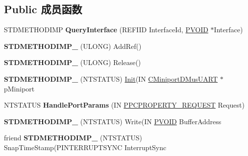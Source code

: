 \subsection*{Public 成员函数}
\begin{DoxyCompactItemize}
\item 
\mbox{\label{class_c_miniport_d_mus_u_a_r_t_stream_a0d84835719b9f4562013d1608ed574c6}} 
S\+T\+D\+M\+E\+T\+H\+O\+D\+I\+MP {\bfseries Query\+Interface} (R\+E\+F\+I\+ID Interface\+Id, \hyperlink{interfacevoid}{P\+V\+O\+ID} $\ast$Interface)
\item 
\mbox{\label{class_c_miniport_d_mus_u_a_r_t_stream_ae28ed3c32fb440644bf3e9f3f53a99bf}} 
{\bfseries S\+T\+D\+M\+E\+T\+H\+O\+D\+I\+M\+P\+\_\+} (U\+L\+O\+NG) Add\+Ref()
\item 
\mbox{\label{class_c_miniport_d_mus_u_a_r_t_stream_a3eb9997a9e082e897bc23c51761fca14}} 
{\bfseries S\+T\+D\+M\+E\+T\+H\+O\+D\+I\+M\+P\+\_\+} (U\+L\+O\+NG) Release()
\item 
\mbox{\label{class_c_miniport_d_mus_u_a_r_t_stream_aea8a01d70d8bafca53db0f4cefb78c06}} 
{\bfseries S\+T\+D\+M\+E\+T\+H\+O\+D\+I\+M\+P\+\_\+} (N\+T\+S\+T\+A\+T\+US) \hyperlink{class_init}{Init}(IN \hyperlink{class_c_miniport_d_mus_u_a_r_t}{C\+Miniport\+D\+Mus\+U\+A\+RT} $\ast$p\+Miniport
\item 
\mbox{\label{class_c_miniport_d_mus_u_a_r_t_stream_ad77de24362c0909e74fc04e1e72ce54e}} 
N\+T\+S\+T\+A\+T\+US {\bfseries Handle\+Port\+Params} (IN \hyperlink{struct___p_c_p_r_o_p_e_r_t_y___r_e_q_u_e_s_t}{P\+P\+C\+P\+R\+O\+P\+E\+R\+T\+Y\+\_\+\+R\+E\+Q\+U\+E\+ST} Request)
\item 
\mbox{\label{class_c_miniport_d_mus_u_a_r_t_stream_a58130d311ba6d5e782552f836528f0f4}} 
{\bfseries S\+T\+D\+M\+E\+T\+H\+O\+D\+I\+M\+P\+\_\+} (N\+T\+S\+T\+A\+T\+US) Write(IN \hyperlink{interfacevoid}{P\+V\+O\+ID} Buffer\+Address
\item 
\mbox{\label{class_c_miniport_d_mus_u_a_r_t_stream_a95d7cc6aabcef0301a6829c47a5b1d16}} 
friend {\bfseries S\+T\+D\+M\+E\+T\+H\+O\+D\+I\+M\+P\+\_\+} (N\+T\+S\+T\+A\+T\+US) Snap\+Time\+Stamp(P\+I\+N\+T\+E\+R\+R\+U\+P\+T\+S\+Y\+NC Interrupt\+Sync
\end{DoxyCompactItemize}
